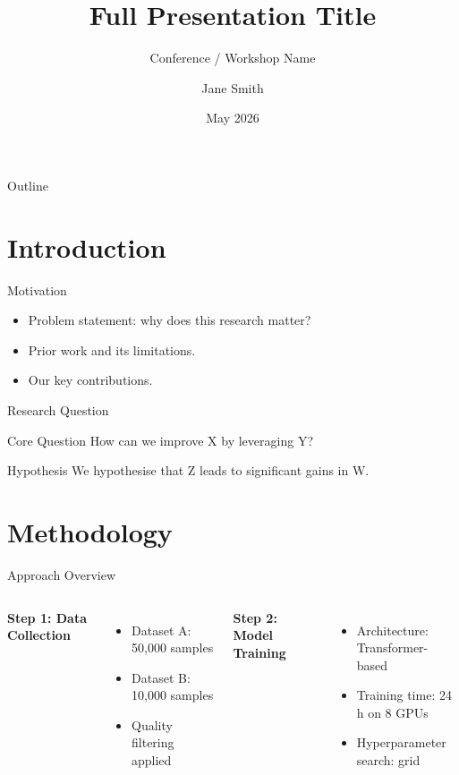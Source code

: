 \documentclass[aspectratio=169]{beamer}
\title[Short Title]{Full Presentation Title}
\subtitle{Conference / Workshop Name}
\author[J. Smith]{Jane Smith}
\institute[MIT]{Massachusetts Institute of Technology \\ \texttt{jsmith@mit.edu}}
\date{May 2026}
\begin{document}
\begin{frame}
  \titlepage
\end{frame}

\begin{frame}{Outline}
  \tableofcontents
\end{frame}

\section{Introduction}

\begin{frame}{Motivation}
  \begin{itemize}
    \item Problem statement: why does this research matter?
    \item Prior work and its limitations.
    \item Our key contributions.
  \end{itemize}
\end{frame}

\begin{frame}{Research Question}
  \begin{block}{Core Question}
    How can we improve X by leveraging Y?
  \end{block}

  \vspace{0.5em}
  \begin{exampleblock}{Hypothesis}
    We hypothesise that Z leads to significant gains in W.
  \end{exampleblock}
\end{frame}

\section{Methodology}

\begin{frame}{Approach Overview}
  \begin{columns}
    \textbf{Step 1: Data Collection}
    \begin{itemize}
      \item Dataset A: 50{,}000 samples
      \item Dataset B: 10{,}000 samples
      \item Quality filtering applied
    \end{itemize}

    \textbf{Step 2: Model Training}
    \begin{itemize}
      \item Architecture: Transformer-based
      \item Training time: 24 h on 8 GPUs
      \item Hyperparameter search: grid
    \end{itemize}
  \end{columns}
\end{frame}
\end{document}
